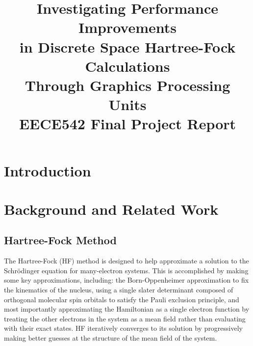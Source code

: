\documentclass[journal, twoside]{IEEEtran}
\begin{document}

\title{Investigating Performance Improvements\\in Discrete Space Hartree-Fock Calculations\\Through Graphics Processing Units\\{\large EECE542 Final Project Report}}
\author{
}

%
{}
\maketitle

\section{Introduction}

\lipsum[1]

\section{Background and Related Work}

\lipsum[1]

\subsection{Hartree-Fock Method}

The Hartree-Fock (HF) method \cite{szabo-ostlund} is designed to help approximate a solution to the Schr\"{o}dinger equation for many-electron systems. This is accomplished by making some key approximations, including: the Born-Oppenheimer approximation to fix the kinematics of the nucleus, using a single slater determinant composed of orthogonal molecular spin orbitals to satisfy the Pauli exclusion principle, and most importantly approximating the Hamiltonian as a single electron function by treating the other electrons in the system as a mean field rather than evaluating with their exact states. HF iteratively converges to its solution by progressively making better guesses at the structure of the mean field of the system.
\end{document}

